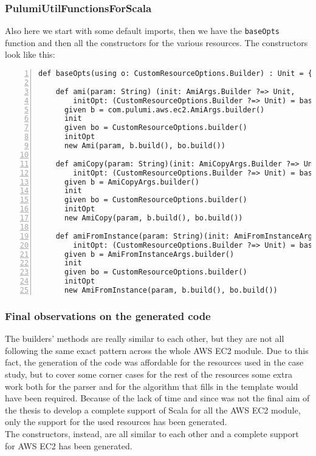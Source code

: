 \subsubsection{PulumiUtilFunctionsForScala}
Also here we start with some default imports, then we have the \texttt{baseOpts} function and then all the constructors for the various resources.
The constructors look like this:\\
\begin{minipage}{\linewidth}
  \begin{lstlisting}[numbers=left, numberstyle=\tiny, numbersep=-5pt, stepnumber=1]
    def baseOpts(using o: CustomResourceOptions.Builder) : Unit = {} 

    def ami(param: String) (init: AmiArgs.Builder ?=> Unit, 
        initOpt: (CustomResourceOptions.Builder ?=> Unit) = baseOpts): Ami =
      given b = com.pulumi.aws.ec2.AmiArgs.builder()
      init
      given bo = CustomResourceOptions.builder()
      initOpt
      new Ami(param, b.build(), bo.build())
    
    def amiCopy(param: String)(init: AmiCopyArgs.Builder ?=> Unit, 
        initOpt: (CustomResourceOptions.Builder ?=> Unit) = baseOpts): AmiCopy =
      given b = AmiCopyArgs.builder()
      init
      given bo = CustomResourceOptions.builder()
      initOpt
      new AmiCopy(param, b.build(), bo.build())
    
    def amiFromInstance(param: String)(init: AmiFromInstanceArgs.Builder ?=> Unit, 
        initOpt: (CustomResourceOptions.Builder ?=> Unit) = baseOpts): AmiFromInstance =
      given b = AmiFromInstanceArgs.builder()
      init
      given bo = CustomResourceOptions.builder()
      initOpt
      new AmiFromInstance(param, b.build(), bo.build())
  \end{lstlisting}
\end{minipage}


\subsubsection{Final observations on the generated code}
The builders' methods are really similar to each other, but they are not all following the same exact pattern across the whole AWS EC2 module.
Due to this fact, the generation of the code was affordable for the resources used in the case study, but to cover some corner cases for the rest of the resources some extra work both for the parser and for the algorithm that fills in the template would have been required.
Because of the lack of time and since was not the final aim of the thesis to develop a complete support of Scala for all the AWS EC2 module, only the support for the used resources has been generated.\\
The constructors, instead, are all similar to each other and a complete support for AWS EC2 has been generated.